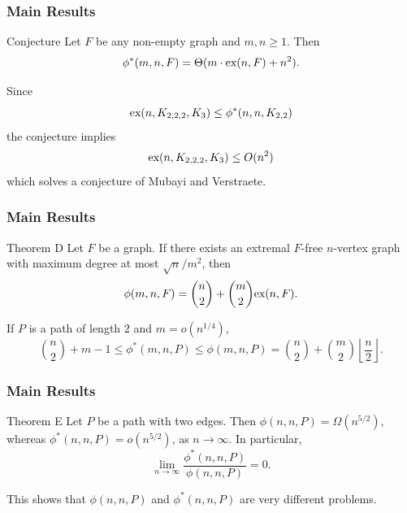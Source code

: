 \documentclass{beamer}
\newcommand*{\ex}{\textnormal{ex}}
\begin{document}
\begin{frame}
  \frametitle{Main Results}

  \begin{block}{Conjecture}
    Let $F$ be any non-empty graph and $m, n \geq 1$. Then
    \[ 
      \phi^*(m,n,F) = \Theta(m \cdot \ex(n,F) + n^2).
    \]
  \end{block}

  \vspace{0.3cm}

  Since
  \[
    \ex(n, K_{2, 2, 2}, K_3) \leq \phi^*(n, n, K_{2, 2})
  \]
  the conjecture implies
  \[
    \ex(n, K_{2, 2, 2}, K_3) \leq O(n^{2})
  \]
  which solves a conjecture of Mubayi and Verstraete.
\end{frame}

\begin{frame}
  \frametitle{Main Results}

  \begin{block}{Theorem D}
    Let $F$ be a graph. If there exists an extremal $F$-free $n$-vertex graph with maximum degree at most $\sqrt{n}/m^2$, then 
    \[ 
      \phi(m, n, F) = \binom{n}{2} + \binom{m}{2}\ex(n,F).
    \]
  \end{block}

  \pause

  \vspace{0.3cm}

  If $P$ is a path of length $2$ and $m = o(n^{1/4})$, 
  \[
    \binom{n}{2} + m - 1 \leq \phi^*(m, n, P) \leq \phi(m, n, P) = \binom{n}{2} + \binom{m}{2} \left\lfloor \frac{n}{2}\right\rfloor. 
  \]
\end{frame}

\begin{frame}
  \frametitle{Main Results}

  \begin{block}{Theorem E}
    Let $P$ be a path with two edges. Then $\phi(n, n, P) = \Omega(n^{5/2})$, whereas $\phi^*(n, n, P) = o(n^{5/2})$, as $n \rightarrow \infty$. In particular, 
    \[ 
      \lim_{n \rightarrow \infty} \frac{\phi^*(n, n, P)}{\phi(n, n, P)} = 0.
    \]
  \end{block}

  \pause

  \vspace{0.3cm}

  This shows that $\phi(n, n, P)$ and $\phi^*(n, n, P)$ are very different problems.
\end{frame}
\end{document}
